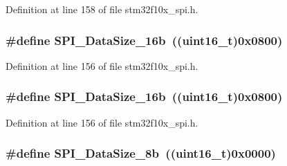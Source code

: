Definition at line 158 of file stm32f10x\+\_\+spi.\+h.

\subsubsection[{\texorpdfstring{S\+P\+I\+\_\+\+Data\+Size\+\_\+16b}{SPI_DataSize_16b}}]{\setlength{\rightskip}{0pt plus 5cm}\#define S\+P\+I\+\_\+\+Data\+Size\+\_\+16b~(({\bf uint16\+\_\+t})0x0800)}\hypertarget{group___s_p_i__data__size_ga8af2c8ca5c2162423531ebf560e0a41d}{}\label{group___s_p_i__data__size_ga8af2c8ca5c2162423531ebf560e0a41d}


Definition at line 156 of file stm32f10x\+\_\+spi.\+h.

\subsubsection[{\texorpdfstring{S\+P\+I\+\_\+\+Data\+Size\+\_\+16b}{SPI_DataSize_16b}}]{\setlength{\rightskip}{0pt plus 5cm}\#define S\+P\+I\+\_\+\+Data\+Size\+\_\+16b~(({\bf uint16\+\_\+t})0x0800)}\hypertarget{group___s_p_i__data__size_ga8af2c8ca5c2162423531ebf560e0a41d}{}\label{group___s_p_i__data__size_ga8af2c8ca5c2162423531ebf560e0a41d}


Definition at line 156 of file stm32f10x\+\_\+spi.\+h.

\subsubsection[{\texorpdfstring{S\+P\+I\+\_\+\+Data\+Size\+\_\+8b}{SPI_DataSize_8b}}]{\setlength{\rightskip}{0pt plus 5cm}\#define S\+P\+I\+\_\+\+Data\+Size\+\_\+8b~(({\bf uint16\+\_\+t})0x0000)}\hypertarget{group___s_p_i__data__size_ga56721814a935922b6ca7c49060509765}{}\label{group___s_p_i__data__size_ga56721814a935922b6ca7c49060509765}


